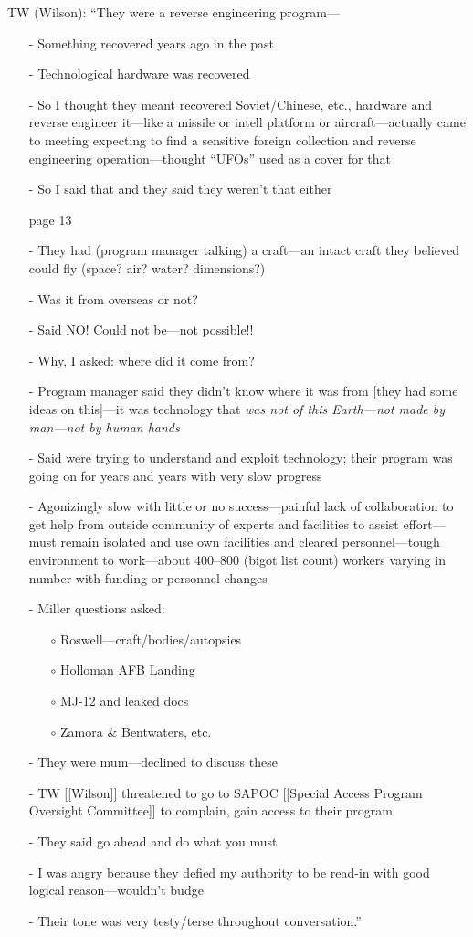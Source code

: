 \begin{svgraybox}
\noindent TW (Wilson): ``They were a reverse engineering program---
\begin{enumerate}
\item[-]
Something recovered years ago in the past
\item[-]
Technological hardware was recovered
\item[-]
So I thought they meant recovered Soviet/Chinese, etc., hardware and reverse
engineer it---like a missile or intell platform or aircraft---actually came to
meeting expecting to find a sensitive foreign collection and reverse
engineering operation---thought ``UFOs'' used as a cover for that
\item[-]
So I said that and they said they weren't that either
\item[]page 13
\item[-]
They had (program manager talking) a craft---an intact craft they believed
could fly (space? air? water? dimensions?)
\item[-]  Was it from overseas or not?
\item[-]  Said NO! Could not be---not possible!!
\item[-]  Why, I asked: where did it come from?
\item[-]  Program manager said they didn't know where it was from [they had some ideas on this]---it was technology that {\it  was not of this Earth---not made by man---not by human hands}
\item[-] Said were trying to understand and exploit technology; their program was going on for years and years with very slow progress
\item[-] Agonizingly slow with little or no success---painful lack of collaboration to get help from outside community of experts and facilities to assist
effort---must remain isolated and use own facilities and cleared personnel---tough
environment to work---about 400--800 (bigot list count) workers varying in number with funding or personnel changes
\item[-] Miller questions asked:\begin{enumerate}
\item[$\circ$] Roswell---craft/bodies/autopsies
\item[$\circ$] Holloman AFB Landing
\item[$\circ$] MJ-12 and leaked docs
\item[$\circ$] Zamora {\&} Bentwaters, etc.
\end{enumerate}
\item[-] They were mum---declined to discuss these
\item[-] TW [[Wilson]] threatened to go to SAPOC [[Special Access Program Oversight Committee]] to complain, gain access to their program
\item[-] They said go ahead and do what you must
\item[-] I was angry because they defied my authority to be read-in with good logical reason---wouldn't budge
\item[-] Their tone was very testy/terse throughout conversation.''
\end{enumerate}


\end{svgraybox}

